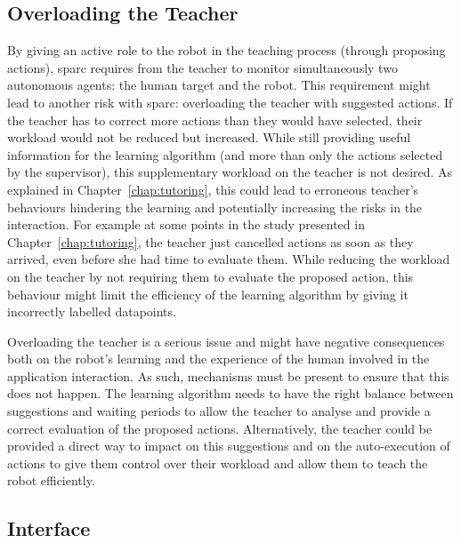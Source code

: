 \subsection{Overloading the Teacher}

By giving an active role to the robot in the teaching process (through proposing actions), \gls{sparc} requires from the teacher to  monitor simultaneously two autonomous agents: the human target and the robot. This requirement might lead to another risk with \gls{sparc}: overloading the teacher with suggested actions. If the teacher has to correct more actions than they would have selected, their workload would not be reduced but increased. While still providing useful information for the learning algorithm (and more than only the actions selected by the supervisor), this supplementary workload on the teacher is not desired. As explained in Chapter~\ref{chap:tutoring}, this could lead to erroneous teacher's behaviours hindering the learning and potentially increasing the risks in the interaction. For example at some points in the study presented in Chapter~\ref{chap:tutoring}, the teacher just cancelled actions as soon as they arrived, even before she had time to evaluate them. While reducing the workload on the teacher by not requiring them to evaluate the proposed action, this behaviour might limit the efficiency of the learning algorithm by giving it incorrectly labelled datapoints. 

Overloading the teacher is a serious issue and might have negative consequences both on the robot's learning and the experience of the human involved in the application interaction. As such, mechanisms must be present to ensure that this does not happen. The learning algorithm needs to have the right balance between suggestions and waiting periods to allow the teacher to analyse and provide a correct evaluation of the proposed actions. Alternatively, the teacher could be provided a direct way to impact on this suggestions and on the auto-execution of actions to give them control over their workload and allow them to teach the robot efficiently.

\subsection{Interface}\label{sec:disc_lim_interface}

